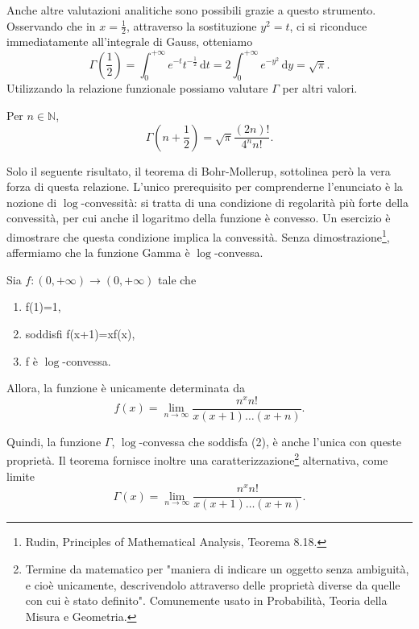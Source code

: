 Anche altre valutazioni analitiche sono possibili grazie a questo strumento. Osservando che in $x=\frac{1}{2}$, attraverso la sostituzione $y^2=t$, ci si riconduce immediatamente all'integrale di Gauss, otteniamo 
\[
	\Gamma\left(\frac{1}{2}\right)=\int_{0}^{+\infty}e^{-t}t^{-\frac{1}{2}}\,\mathrm{d}t=2\int_{0}^{+\infty}e^{-y^2}\,\mathrm{d}y=\sqrt{\pi}.
\] 
Utilizzando la relazione funzionale possiamo valutare $\Gamma$ per altri valori.
\begin{Res} Per $n\in\mathbb{N}$,
	\[
		\Gamma\left(n+\frac{1}{2}\right) =\sqrt{\pi} \frac{(2n)!}{4^n n!}.
	\]
\end{Res}

Solo il seguente risultato, il teorema di Bohr-Mollerup, sottolinea però la vera forza di questa relazione. L'unico prerequisito per comprenderne l'enunciato è la nozione di $\log$-convessità: si tratta di una condizione di regolarità più forte della convessità, per cui anche il logaritmo della funzione è convesso. Un esercizio è dimostrare che questa condizione implica la convessità. Senza dimostrazione\footnote{Rudin, Principles of Mathematical Analysis, Teorema 8.18.}, affermiamo che la funzione Gamma è $\log$-convessa.

\begin{The}
Sia $f:(0,+\infty)\to(0,+\infty)$ tale che
\begin{enumerate}
	\item f(1)=1,
	\item soddisfi f(x+1)=xf(x),
	\item f è $\log$-convessa.
\end{enumerate}
Allora, la funzione è unicamente determinata da
\[
	f(x)=\lim_{n\to\infty}\frac{n^x n!}{x(x+1)\dots(x+n)}.	
\]
\end{The}
Quindi, la funzione $\Gamma$, $\log$-convessa che soddisfa (2), è anche l'unica con queste proprietà. Il teorema fornisce inoltre una caratterizzazione\footnote{Termine da matematico per "maniera di indicare un oggetto senza ambiguità, e cioè unicamente, descrivendolo attraverso delle proprietà diverse da quelle con cui è stato definito". Comunemente usato in Probabilità, Teoria della Misura e Geometria.} alternativa, come limite
\[
	\Gamma(x)=\lim_{n\to\infty}\frac{n^x n!}{x(x+1)\dots(x+n)}.	
\]

\pagebreak